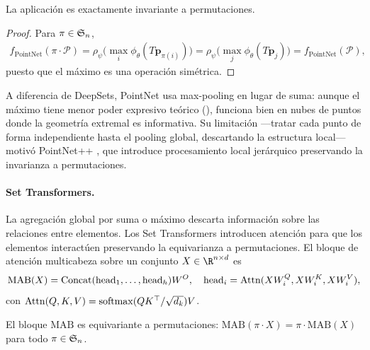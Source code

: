 \begin{proposition}
\label{prop:groups:pointnet-invariance}
La aplicaci\'on  es exactamente invariante a
permutaciones.
\end{proposition}

\begin{proof}
Para $\pi \in \mathfrak{S}_n$,
\begin{align}
  f_{\text{PointNet}}(\pi \cdot \mathcal{P})
  = \rho_\psi\Big(\max_i \phi_\theta(T \mathbf{p}_{\pi(i)})\Big)
  = \rho_\psi\Big(\max_j \phi_\theta(T \mathbf{p}_j)\Big)
  = f_{\text{PointNet}}(\mathcal{P}),
\end{align}
puesto que el m\'aximo es una operaci\'on sim\'etrica.
\end{proof}

A diferencia de DeepSets, PointNet usa max-pooling en lugar de suma: aunque el
m\'aximo tiene menor poder expresivo te\'orico
(), funciona bien en nubes de puntos donde la
geometr\'ia extremal es informativa. Su limitaci\'on ---tratar cada punto de
forma independiente hasta el pooling global, descartando la estructura local---
motiv\'o PointNet++ \citep{qi2017pointnetplus}, que introduce procesamiento local
jer\'arquico preservando la invarianza a permutaciones.

\paragraph{Set Transformers.}
La agregaci\'on global por suma o m\'aximo descarta informaci\'on sobre las
relaciones entre elementos. Los Set Transformers introducen atenci\'on para que
los elementos interact\'uen preservando la equivarianza a permutaciones. El
bloque de atenci\'on multicabeza sobre un conjunto $X \in \R^{n \times d}$ es
\begin{equation}
  \text{MAB}(X) = \operatorname{Concat}(\text{head}_1, \dots, \text{head}_h) W^O,
  \quad
  \text{head}_i = \operatorname{Attn}(X W_i^Q, X W_i^K, X W_i^V),
\end{equation}
con $\operatorname{Attn}(Q, K, V) = \operatorname{softmax}(QK^\top / \sqrt{d_k}) V$.

\begin{proposition}
\label{prop:groups:attention-equivariance}
El bloque $\text{MAB}$ es equivariante a permutaciones: $\text{MAB}(\pi \cdot X)
= \pi \cdot \text{MAB}(X)$ para todo $\pi \in \mathfrak{S}_n$.
\end{proposition}


